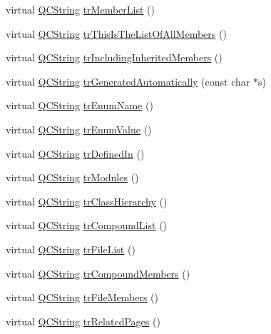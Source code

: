 \begin{DoxyCompactItemize}
virtual \hyperlink{class_q_c_string}{Q\-C\-String} \hyperlink{class_translator_greek_a5f788c561be2a2386720266688ad7561}{tr\-Member\-List} ()
\item 
virtual \hyperlink{class_q_c_string}{Q\-C\-String} \hyperlink{class_translator_greek_a011ff392bb2087e2804dc648db7b3bdd}{tr\-This\-Is\-The\-List\-Of\-All\-Members} ()
\item 
virtual \hyperlink{class_q_c_string}{Q\-C\-String} \hyperlink{class_translator_greek_ae6babe31ac1979ada5737392536bd239}{tr\-Including\-Inherited\-Members} ()
\item 
virtual \hyperlink{class_q_c_string}{Q\-C\-String} \hyperlink{class_translator_greek_a25156a73baa8406a915eaa5a6824b359}{tr\-Generated\-Automatically} (const char $\ast$s)
\item 
virtual \hyperlink{class_q_c_string}{Q\-C\-String} \hyperlink{class_translator_greek_a50df17e22ad96870c7937be7e1ab8dfc}{tr\-Enum\-Name} ()
\item 
virtual \hyperlink{class_q_c_string}{Q\-C\-String} \hyperlink{class_translator_greek_a5b1d2d5c6825641661ff2cfaeb84307e}{tr\-Enum\-Value} ()
\item 
virtual \hyperlink{class_q_c_string}{Q\-C\-String} \hyperlink{class_translator_greek_a5ee5473527c64fc3827deca81e253acf}{tr\-Defined\-In} ()
\item 
virtual \hyperlink{class_q_c_string}{Q\-C\-String} \hyperlink{class_translator_greek_aef7bca894dd93b7fd6803518cede7ef7}{tr\-Modules} ()
\item 
virtual \hyperlink{class_q_c_string}{Q\-C\-String} \hyperlink{class_translator_greek_a6676bf94846fa80e4a23cf9ea3214b54}{tr\-Class\-Hierarchy} ()
\item 
virtual \hyperlink{class_q_c_string}{Q\-C\-String} \hyperlink{class_translator_greek_adc612d045d0abf0cfa5085254fca8db5}{tr\-Compound\-List} ()
\item 
virtual \hyperlink{class_q_c_string}{Q\-C\-String} \hyperlink{class_translator_greek_a1c967abf4f2578ff4185ab2e10f71e14}{tr\-File\-List} ()
\item 
virtual \hyperlink{class_q_c_string}{Q\-C\-String} \hyperlink{class_translator_greek_a05e152ef7d0c15bb2b34fc12e1a25c56}{tr\-Compound\-Members} ()
\item 
virtual \hyperlink{class_q_c_string}{Q\-C\-String} \hyperlink{class_translator_greek_ae5ab09d67500e729b9f1b29f4ea57425}{tr\-File\-Members} ()
\item 
virtual \hyperlink{class_q_c_string}{Q\-C\-String} \hyperlink{class_translator_greek_a8ed40826492d6303375b3031fc88d3b2}{tr\-Related\-Pages} ()

\end{DoxyCompactItemize}
